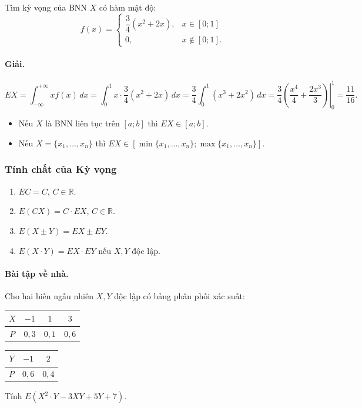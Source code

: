 \begin{vidu}[VD 6]
Tìm kỳ vọng của BNN $X$ có hàm mật độ:
\[
f(x) = \begin{cases}
\dfrac{3}{4}(x^2 + 2x), & x \in [0; 1] \\
0, & x \notin [0; 1].
\end{cases}
\]

\paragraph{Giải.}
\[
EX = \int_{-\infty}^{+\infty} x f(x)\,dx = \int_0^1 x \cdot \frac{3}{4}(x^2 + 2x)\,dx = \frac{3}{4} \int_0^1 (x^3 + 2x^2)\,dx = \frac{3}{4} \left.\left(\frac{x^4}{4} + \frac{2x^3}{3}\right)\right|_0^1 = \frac{11}{16}.
\]
\end{vidu}

\begin{chuy}
\begin{itemize}
    \item Nếu $X$ là BNN liên tục trên $[a; b]$ thì $EX \in [a; b]$.
    \item Nếu $X = \{x_1, \dots, x_n\}$ thì $EX \in [\min\{x_1, \dots, x_n\}; \max\{x_1, \dots, x_n\}]$.
\end{itemize}
\end{chuy}

\subsubsection{Tính chất của Kỳ vọng}
\begin{enumerate}[label=\arabic*)]
    \item $EC = C$, $C \in \mathbb{R}$.
    \item $E(CX) = C \cdot EX$, $C \in \mathbb{R}$.
    \item $E(X \pm Y) = EX \pm EY$.
    \item $E(X \cdot Y) = EX \cdot EY$ nếu $X, Y$ độc lập.
\end{enumerate}

\paragraph{Bài tập về nhà.} Cho hai biến ngẫu nhiên $X, Y$ độc lập có bảng phân phối xác suất:
\begin{center}
\begin{tabular}{|c|c|c|c|}
\hline
$X$ & $-1$ & $1$ & $3$ \\
\hline
$P$ & $0{,}3$ & $0{,}1$ & $0{,}6$ \\
\hline
\end{tabular}
\qquad
\begin{tabular}{|c|c|c|}
\hline
$Y$ & $-1$ & $2$ \\
\hline
$P$ & $0{,}6$ & $0{,}4$ \\
\hline
\end{tabular}
\end{center}
Tính $E(X^2 \cdot Y - 3XY + 5Y + 7)$.

